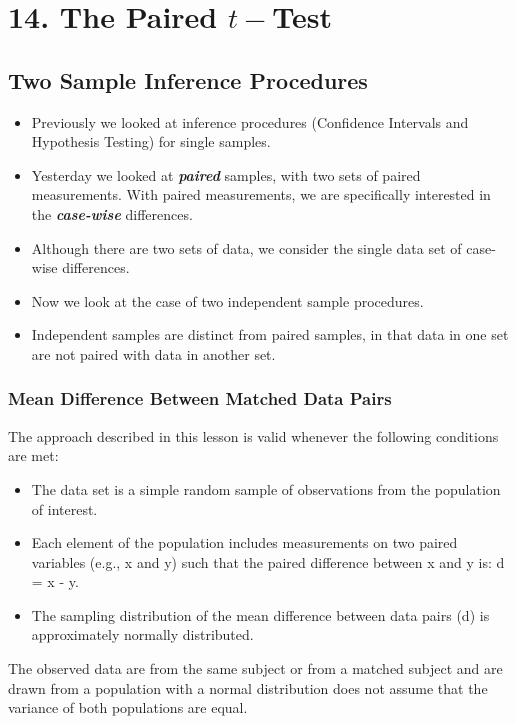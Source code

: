 \documentclass[]{report}
\begin{document}
\chapter{14. The Paired $t-$Test}




\section{Two Sample Inference Procedures}
\begin{itemize}
\item Previously we looked at inference procedures (Confidence Intervals and Hypothesis Testing) for single samples.
\item Yesterday we looked at \textit{\textbf{paired}} samples, with two sets of paired measurements. With paired measurements, we are specifically interested in the \textbf{\textit{case-wise}} differences.
\item Although there are two sets of data, we consider the single data set of case-wise differences.
\item Now we look at the case of two independent sample procedures.
\item Independent samples are distinct from paired samples, in that data in one set are not paired with data in another set.
\end{itemize}




\subsection{Mean Difference Between Matched Data Pairs}


The approach described in this lesson is valid whenever the following conditions are met:

\begin{itemize}
\item The data set is a simple random sample of observations from the population of interest.
\item Each element of the population includes measurements on two paired variables (e.g., x and y) such that the paired difference between x and y is: d = x - y.
\item The sampling distribution of the mean difference between data pairs (d) is approximately normally distributed.
\end{itemize}



The observed data are from the same subject or from a matched subject and are drawn from a population with a normal distribution
does not assume that the variance of both populations are equal.
\end{document}
